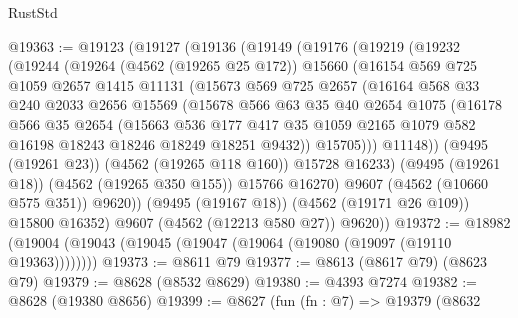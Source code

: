 \begin{lexlean}{RustStd}
\begin{coremodule}
@19363 := @19123
    (@19127
      (@19136
        (@19149
          (@19176
            (@19219
              (@19232
                (@19244
                  (@19264
                    (@4562 (@19265 @25 @172))
                    @15660
                    (@16154
                      @569
                      @725
                      @1059
                      @2657
                      @1415
                      @11131
                      (@15673
                        @569
                        @725
                        @2657
                        (@16164
                          @568
                          @33
                          @240
                          @2033
                          @2656
                          @15569
                          (@15678
                            @566
                            @63
                            @35
                            @40
                            @2654
                            @1075
                            (@16178
                              @566
                              @35
                              @2654
                              (@15663
                                @536
                                @177
                                @417
                                @35
                                @1059
                                @2165
                                @1079
                                @582
                                @16198
                                @18243
                                @18246
                                @18249
                                @18251
                                @9432))
                            @15705)))
                      @11148))
                  (@9495 (@19261 @23))
                  (@4562 (@19265 @118 @160))
                  @15728
                  @16233)
                (@9495 (@19261 @18))
                (@4562 (@19265 @350 @155))
                @15766
                @16270)
              @9607
              (@4562 (@10660 @575 @351))
              @9620))
          (@9495 (@19167 @18))
          (@4562 (@19171 @26 @109))
          @15800
          @16352)
        @9607
        (@4562 (@12213 @580 @27))
        @9620))
@19372 := @18982 (@19004 (@19043 (@19045 (@19047 (@19064 (@19080 (@19097 (@19110 @19363))))))))
@19373 := @8611 @79
@19377 := @8613 (@8617 @79) (@8623 @79)
@19379 := @8628 (@8532 @8629)
@19380 := @4393 @7274
@19382 := @8628 (@19380 @8656)
@19399 := @8627
    (fun (fn : @7) =>
    @19379
      (@8632

\end{coremodule}
\end{lexlean}
